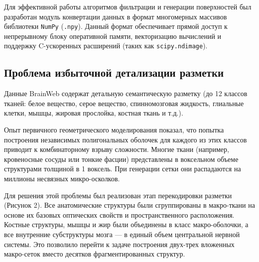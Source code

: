 \documentclass[a4paper,14pt]{article}
\begin{document}
Для эффективной работы алгоритмов фильтрации и генерации поверхностей был разработан модуль конвертации данных в формат многомерных массивов библиотеки \texttt{NumPy} (\texttt{.npy}). Данный формат обеспечивает прямой доступ к непрерывному блоку оперативной памяти, векторизацию вычислений и поддержку C-ускоренных расширений (таких как \texttt{scipy.ndimage}).

\subsection{Проблема избыточной детализации разметки}
Данные BrainWeb содержат детальную семантическую разметку (до 12 классов тканей: белое вещество, серое вещество, спинномозговая жидкость, глиальные клетки, мышцы, жировая прослойка, костная ткань и т.д.).

Опыт первичного геометрического моделирования показал, что попытка построения независимых полигональных оболочек для каждого из этих классов приводит к комбинаторному взрыву сложности. Многие ткани (например, кровеносные сосуды или тонкие фасции) представлены в воксельном объеме структурами толщиной в 1 воксель. При генерации сетки они распадаются на миллионы несвязных микро-осколков.

Для решения этой проблемы был реализован этап перекодировки разметки (Рисунок 2). Все анатомические структуры были сгруппированы в макро-ткани на основе их базовых оптических свойств и пространственного расположения. Костные структуры, мышцы и жир были объединены в класс макро-оболочки, а все внутренние субструктуры мозга — в единый объем центральной нервной системы. Это позволило перейти к задаче построения двух-трех вложенных макро-сеток вместо десятков фрагментированных структур.
\end{document}
